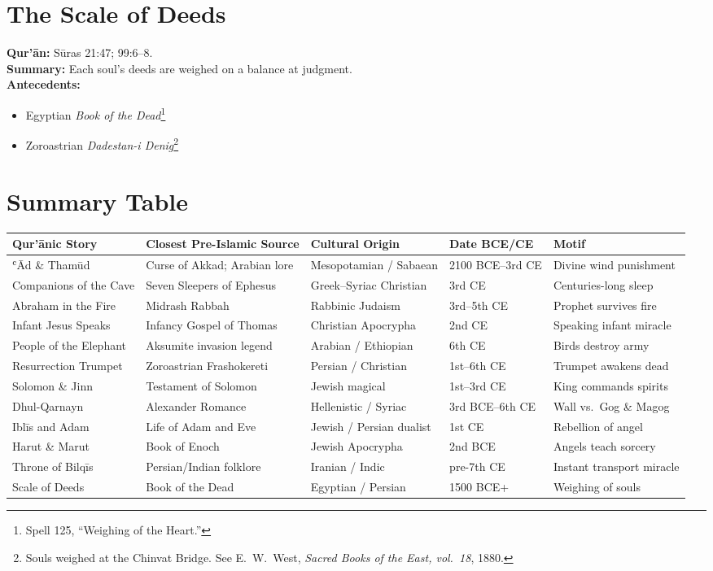 \documentclass[11pt,a4paper]{article}
\begin{document}
\section{The Scale of Deeds}
\textbf{Qur’ān:} Sūras 21:47; 99:6–8.\\
\textbf{Summary:} Each soul’s deeds are weighed on a balance at judgment.\\
\textbf{Antecedents:}
\begin{itemize}
  \item Egyptian \emph{Book of the Dead}\footnote{Spell 125, “Weighing of the Heart.”}
  \item Zoroastrian \emph{Dadestan-i Denig}\footnote{Souls weighed at the Chinvat Bridge. See E.\ W.\ West, \emph{Sacred Books of the East, vol.\ 18}, 1880.}
\end{itemize}

\newpage
\section{Summary Table}
\renewcommand{\arraystretch}{1.2}
\begin{longtable}{>{\raggedright}p{3.3cm} >{\raggedright}p{3.8cm} >{\raggedright}p{3cm} >{\raggedright}p{2cm} >{\raggedright\arraybackslash}p{4cm}}
\toprule
\textbf{Qur’ānic Story} & \textbf{Closest Pre-Islamic Source} & \textbf{Cultural Origin} & \textbf{Date BCE/CE} & \textbf{Motif} \\
\midrule
ʿĀd \& Thamūd & Curse of Akkad; Arabian lore & Mesopotamian / Sabaean & 2100 BCE–3rd CE & Divine wind punishment \\
Companions of the Cave & Seven Sleepers of Ephesus & Greek–Syriac Christian & 3rd CE & Centuries-long sleep \\
Abraham in the Fire & Midrash Rabbah & Rabbinic Judaism & 3rd–5th CE & Prophet survives fire \\
Infant Jesus Speaks & Infancy Gospel of Thomas & Christian Apocrypha & 2nd CE & Speaking infant miracle \\
People of the Elephant & Aksumite invasion legend & Arabian / Ethiopian & 6th CE & Birds destroy army \\
Resurrection Trumpet & Zoroastrian Frashokereti & Persian / Christian & 1st–6th CE & Trumpet awakens dead \\
Solomon \& Jinn & Testament of Solomon & Jewish magical & 1st–3rd CE & King commands spirits \\
Dhul-Qarnayn & Alexander Romance & Hellenistic / Syriac & 3rd BCE–6th CE & Wall vs.\ Gog \& Magog \\
Iblīs and Adam & Life of Adam and Eve & Jewish / Persian dualist & 1st CE & Rebellion of angel \\
Harut \& Marut & Book of Enoch & Jewish Apocrypha & 2nd BCE & Angels teach sorcery \\
Throne of Bilqīs & Persian/Indian folklore & Iranian / Indic & pre-7th CE & Instant transport miracle \\
Scale of Deeds & Book of the Dead & Egyptian / Persian & 1500 BCE+ & Weighing of souls \\
\bottomrule
\end{longtable}
\end{document}
